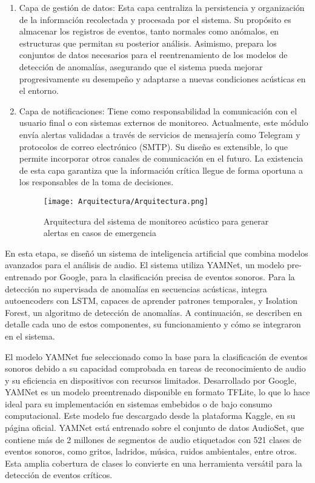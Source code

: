 \begin{enumerate}
      \item Capa de gestión de datos: Esta capa centraliza la persistencia y organización de la información recolectada y procesada por el sistema. Su propósito es almacenar los registros de eventos, tanto normales como anómalos, en estructuras que permitan su posterior análisis. Asimismo, prepara los conjuntos de datos necesarios para el reentrenamiento de los modelos de detección de anomalías, asegurando que el sistema pueda mejorar progresivamente su desempeño y adaptarse a nuevas condiciones acústicas en el entorno.
      \item Capa de notificaciones: Tiene como responsabilidad la comunicación con el usuario final o con sistemas externos de monitoreo. Actualmente, este módulo envía alertas validadas a través de servicios de mensajería como Telegram y protocolos de correo electrónico (SMTP). Su diseño es extensible, lo que permite incorporar otros canales de comunicación en el futuro. La existencia de esta capa garantiza que la información crítica llegue de forma oportuna a los responsables de la toma de decisiones.

            \begin{figure}[ht!]
                  \centering
                  \texttt{[image: Arquitectura/Arquitectura.png]}
                  \caption{Arquitectura del sistema de monitoreo acústico para generar alertas en casos de emergencia}
                  \label{fig:arquitectura}
            \end{figure}
\end{enumerate}


En esta etapa, se diseñó un sistema de inteligencia artificial que combina modelos avanzados para el análisis de audio. El sistema utiliza YAMNet, un modelo pre-entrenado por Google, para la clasificación precisa de eventos sonoros. Para la detección no supervisada de anomalías en secuencias acústicas, integra autoencoders con LSTM, capaces de aprender patrones temporales, y Isolation Forest, un algoritmo de detección de anomalías. A continuación, se describen en detalle cada uno de estos componentes, su funcionamiento y cómo se integraron en el sistema.


El modelo YAMNet fue seleccionado como la base para la clasificación de eventos sonoros debido a su capacidad comprobada en tareas de reconocimiento de audio y su eficiencia en dispositivos con recursos limitados. Desarrollado por Google, YAMNet es un modelo preentrenado disponible en formato TFLite, lo que lo hace ideal para su implementación en sistemas embebidos o de bajo consumo computacional. Este modelo fue descargado desde la plataforma Kaggle, en su página oficial. YAMNet está entrenado sobre el conjunto de datos AudioSet, que contiene más de 2 millones de segmentos de audio etiquetados con 521 clases de eventos sonoros, como gritos, ladridos, música, ruidos ambientales, entre otros. Esta amplia cobertura de clases lo convierte en una herramienta versátil para la detección de eventos críticos.


